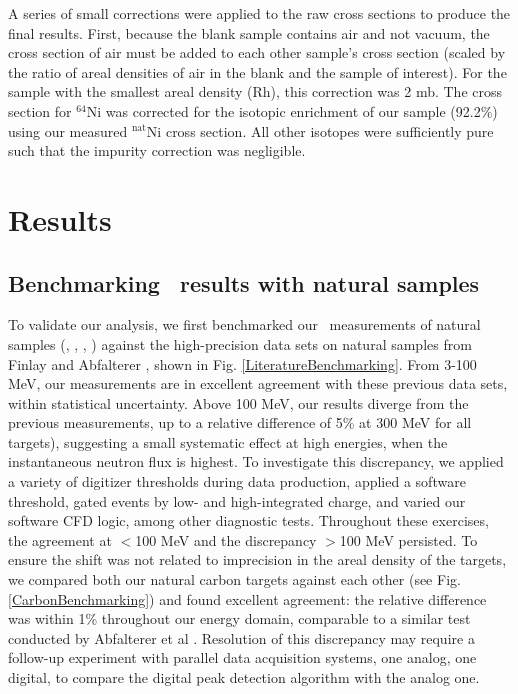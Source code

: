 A series of small corrections were applied to the raw cross sections to produce
the final results. First, because the blank sample contains air and not vacuum,
the cross section of air must be added to each other sample's cross section (scaled by  
the ratio of areal densities of air in the blank and the sample of interest).
For the sample with the smallest areal density (Rh), this correction was 2 mb.
The cross section for $^{64}$Ni was corrected for the isotopic enrichment of our
sample (92.2\%) using our measured $^{\text{nat}}$Ni cross section. All other isotopes were 
sufficiently pure such that the impurity correction was negligible.

\section{Results}
\subsection{Benchmarking \tot\ results with natural samples}
To validate our analysis, we first benchmarked our \tot\ measurements of natural samples
(\cNat, \niNat, \snNat, \pbNat) against the high-precision data sets on natural samples from Finlay
\cite{Finlay1993} and Abfalterer \cite{Abfalterer2001}, shown in Fig.
\ref{LiteratureBenchmarking}. From 3-100 MeV, our measurements are in excellent agreement with 
these previous data sets, within statistical uncertainty. Above 100 MeV, our results diverge
from the previous measurements, up to a relative difference of 5\% at 300 MeV for all targets), 
suggesting a small 
systematic effect at high energies, when the instantaneous neutron flux is highest. To investigate
this discrepancy, we applied a variety of digitizer thresholds during data production, applied a 
software threshold, gated events by low- and high-integrated charge, and varied our software CFD 
logic, among other diagnostic tests. Throughout these exercises, the agreement at $<$100 MeV and the 
discrepancy $>$100 MeV persisted. To ensure the shift was not related to imprecision in the areal
density of the targets, we compared both our natural carbon targets against each other (see Fig.
\ref{CarbonBenchmarking}) and found excellent agreement: the relative difference
was within 1\% throughout our energy domain, comparable to a similar test conducted by Abfalterer et
al \cite{Abfalterer2001}. Resolution of this discrepancy may require a follow-up experiment with 
parallel data acquisition systems, one analog, one digital, to compare the digital peak detection
algorithm with the analog one.

